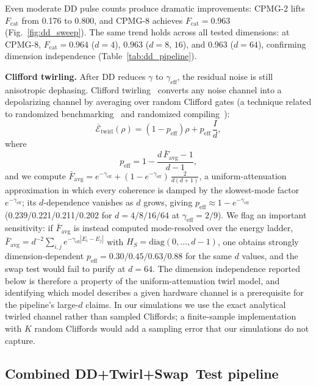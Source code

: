\documentclass[pra,twocolumn,superscriptaddress,longbibliography,floatfix]{revtex4-2}
\begin{document}
Even moderate DD pulse counts produce dramatic improvements: CPMG-2 lifts $F_\mathrm{cat}$ from 0.176 to 0.800, and CPMG-8 achieves $F_\mathrm{cat} = 0.963$ (Fig.~\ref{fig:dd_sweep}).
The same trend holds across all tested dimensions: at CPMG-8, $F_\mathrm{cat} = 0.964$ ($d = 4$), $0.963$ ($d = 8$, $16$), and $0.963$ ($d = 64$), confirming dimension independence (Table~\ref{tab:dd_pipeline}).

\textbf{Clifford twirling.}
After DD reduces $\gamma$ to $\gamma_\mathrm{eff}$, the residual noise is still anisotropic dephasing.
Clifford twirling~\cite{Dankert2009,Wallman2016} converts any noise channel into a depolarizing channel by averaging over random Clifford gates (a technique related to randomized benchmarking~\cite{Dankert2009} and randomized compiling~\cite{Wallman2016}):
\begin{equation}
\overline{\mathcal{E}}_\mathrm{twirl}(\rho) = (1 - p_\mathrm{eff})\rho + p_\mathrm{eff}\, \frac{I}{d},
\label{eq:twirl}
\end{equation}
where
\begin{equation}
p_\mathrm{eff} = 1 - \frac{d\, \bar{F}_\mathrm{avg} - 1}{d - 1},
\label{eq:p_eff}
\end{equation}
and we compute $\bar{F}_\mathrm{avg} = e^{-\gamma_\mathrm{eff}} + (1 - e^{-\gamma_\mathrm{eff}})\,\frac{2}{d(d+1)}$, a uniform-attenuation approximation in which every coherence is damped by the slowest-mode factor $e^{-\gamma_\mathrm{eff}}$; its $d$-dependence vanishes as $d$ grows, giving $p_\mathrm{eff} \approx 1 - e^{-\gamma_\mathrm{eff}}$ (0.239/0.221/0.211/0.202 for $d = 4/8/16/64$ at $\gamma_\mathrm{eff} = 2/9$).
We flag an important sensitivity: if $\bar{F}_\mathrm{avg}$ is instead computed mode-resolved over the energy ladder, $\bar{F}_\mathrm{avg} = d^{-2}\sum_{i,j} e^{-\gamma_\mathrm{eff}|E_i - E_j|}$ with $H_S = \mathrm{diag}(0, \ldots, d-1)$, one obtains strongly dimension-dependent $p_\mathrm{eff} = 0.30/0.45/0.63/0.88$ for the same $d$ values, and the swap test would fail to purify at $d = 64$.
The dimension independence reported below is therefore a property of the uniform-attenuation twirl model, and identifying which model describes a given hardware channel is a prerequisite for the pipeline's large-$d$ claims.
In our simulations we use the exact analytical twirled channel rather than sampled Cliffords; a finite-sample implementation with $K$ random Cliffords would add a sampling error that our simulations do not capture.


\subsection{Combined DD+Twirl+Swap~Test pipeline}
\label{sec:pipeline}
\end{document}
